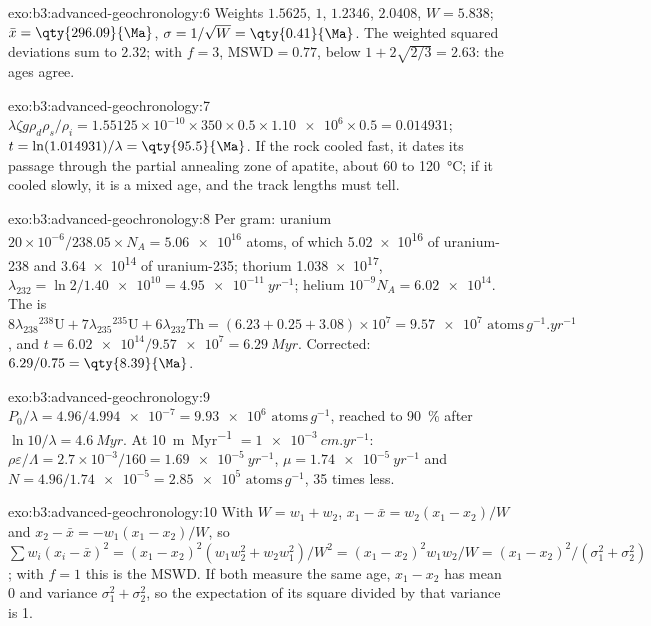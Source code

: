 \begin{solution}{exo:b3:advanced-geochronology:6}
Weights $1.5625$, $1$, $1.2346$, $2.0408$, $W = 5.838$; $\bar x =
\qty{296.09}{\Ma}$, $\sigma = 1/\sqrt W = \qty{0.41}{\Ma}$. The weighted
squared deviations sum to $2.32$; with $f = 3$, $\mathrm{MSWD} = 0.77$, below
$1 + 2\sqrt{2/3} = 2.63$: the ages agree.
\end{solution}

\begin{solution}{exo:b3:advanced-geochronology:7}
$\lambda\zeta g\rho_d\rho_s/\rho_i = 1.55125\times10^{-10}\times350\times0.5
\times\num{1.10e6}\times0.5 = 0.014931$; $t = \ln(1.014931)/\lambda =
\qty{95.5}{\Ma}$. If the rock cooled fast, it dates its passage through the
partial annealing zone of apatite, about 60 to \qty{120}{\celsius}; if it
cooled slowly, it is a mixed age, and the track lengths must tell.
\end{solution}

\begin{solution}{exo:b3:advanced-geochronology:8}
Per gram: uranium $20\times10^{-6}/238.05\times N_A = \num{5.06e16}$ atoms, of
which \num{5.02e16} of uranium-238 and \num{3.64e14} of uranium-235; thorium
\num{1.038e17}, $\lambda_{232} = \ln 2/\num{1.40e10} = \qty{4.95e-11}{yr^{-1}}$;
helium $10^{-9}N_A = \num{6.02e14}$. The  is
$8\lambda_{238}{}^{238}\mathrm U + 7\lambda_{235}{}^{235}\mathrm U +
6\lambda_{232}\mathrm{Th} = (6.23 + 0.25 + 3.08)\times10^7 =
\num{9.57e7}\text{ atoms}\,\unit{g^{-1}.yr^{-1}}$, and $t = \num{6.02e14}/\num{9.57e7} =
\qty{6.29}{Myr}$. Corrected: $6.29/0.75 = \qty{8.39}{\Ma}$.
\end{solution}

\begin{solution}{exo:b3:advanced-geochronology:9}
$P_0/\lambda = 4.96/\num{4.994e-7} = \num{9.93e6}\text{ atoms}\,\unit{g^{-1}}$, reached to
\qty{90}{\percent} after $\ln 10/\lambda = \qty{4.6}{Myr}$. At
\qty{10}{m.Myr^{-1}} $= \qty{1e-3}{cm.yr^{-1}}$: $\rho\varepsilon/\Lambda =
2.7\times10^{-3}/160 = \qty{1.69e-5}{yr^{-1}}$, $\mu = \qty{1.74e-5}{yr^{-1}}$
and $N = 4.96/\num{1.74e-5} = \num{2.85e5}\text{ atoms}\,\unit{g^{-1}}$, 35 times less.
\end{solution}

\begin{solution}{exo:b3:advanced-geochronology:10}
With $W = w_1 + w_2$, $x_1 - \bar x = w_2(x_1 - x_2)/W$ and $x_2 - \bar x =
-w_1(x_1 - x_2)/W$, so $\sum w_i(x_i - \bar x)^2 = (x_1 - x_2)^2(w_1w_2^2 +
w_2w_1^2)/W^2 = (x_1 - x_2)^2w_1w_2/W = (x_1 - x_2)^2/(\sigma_1^2 +
\sigma_2^2)$; with $f = 1$ this is the MSWD. If both measure the same age,
$x_1 - x_2$ has mean 0 and variance $\sigma_1^2 + \sigma_2^2$, so the
expectation of its square divided by that variance is 1.
\end{solution}

